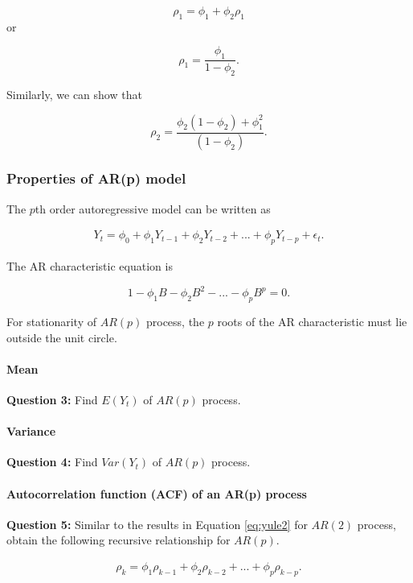\documentclass[]{book}
\let\oldparagraph\paragraph
\renewcommand{\paragraph}[1]{\oldparagraph{#1}\mbox{}}
\begin{document}
\[\rho_1=\phi_1+\phi_2 \rho_1\] or

\[\rho_1 = \frac{\phi_1}{1-\phi_2}.\]

Similarly, we can show that

\[\rho_2 = \frac{\phi_2(1-\phi_2)+\phi_1^2}{(1-\phi_2)}.\]

\hypertarget{properties-of-arp-model}{%
\subsubsection{Properties of AR(p) model}\label{properties-of-arp-model}}

The \(p\)th order autoregressive model can be written as

\begin{align}
Y_t = \phi_0 + \phi_1Y_{t-1}+\phi_2 Y_{t-2}+ ... + \phi_p Y_{t-p}+\epsilon_t.
\end{align}

The AR characteristic equation is

\[1-\phi_1B-\phi_2B^2-...-\phi_pB^p=0.\]

For stationarity of \(AR(p)\) process, the \(p\) roots of the AR characteristic must lie outside the unit circle.

\hypertarget{mean-2}{%
\paragraph{Mean}\label{mean-2}}

\textbf{Question 3: } Find \(E(Y_t)\) of \(AR(p)\) process.

\hypertarget{variance-1}{%
\paragraph{Variance}\label{variance-1}}

\textbf{Question 4: } Find \(Var(Y_t)\) of \(AR(p)\) process.

\hypertarget{autocorrelation-function-acf-of-an-arp-process}{%
\paragraph{Autocorrelation function (ACF) of an AR(p) process}\label{autocorrelation-function-acf-of-an-arp-process}}

\textbf{Question 5: } Similar to the results in Equation \eqref{eq:yule2} for \(AR(2)\) process, obtain the following recursive relationship for \(AR(p)\).

\begin{align}
\label{eq:yulep}
\rho_k = \phi_1\rho_{k-1}+\phi_2 \rho_{k-2} + ... + \phi_p \rho_{k-p}.
\end{align}
\end{document}
